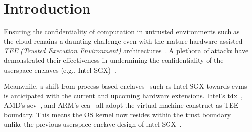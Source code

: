 \section{Introduction}\label{sec:incognitos:intro}
Ensuring the confidentiality of computation in untrusted environments such as the cloud remains a daunting challenge even with the mature hardware-assisted \emph{TEE (Trusted Execution Environment)} architectures~\cite{sgx,kaplan_amd_nodate,tdx}.
A plethora of attacks have demonstrated their effectiveness in undermining the confidentiality of the userspace enclaves (e.g., Intel SGX)~\cite{sgx-cache-attack,cache-attack-sgx,sgx-step,bulck2018nemesis,xu2015controlledchannel,hahnel_high-resolution_2017,cachezoom,sgxspectre,foreshadow}.


Meanwhile, a shift from process-based enclaves~\cite{costan_intel_2016,costan2016sanctum,keystone} such as Intel SGX towards \glspl{cvm} is anticipated with the current and upcoming hardware extensions.
Intel's \gls{tdx}~\cite{tdx}, AMD's \gls{sev}~\cite{amd64,kaplan_amd_nodate}, and ARM's \gls{cca}~\cite{cca} all adopt the virtual machine construct as TEE boundary.
This means the OS kernel now resides within the trust boundary, unlike the previous userspace enclave design of Intel SGX~\cite{sgx}.


